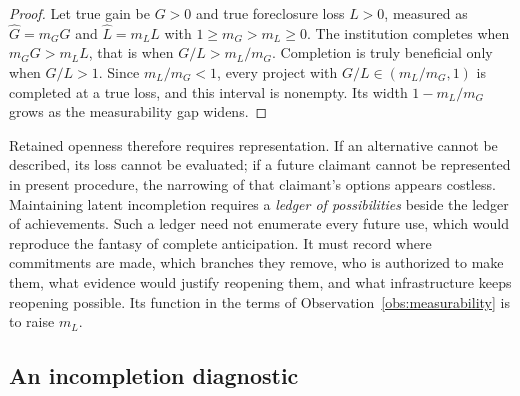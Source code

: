 \begin{proof}
Let true gain be $G>0$ and true foreclosure loss $L>0$, measured as $\widehat G=m_GG$ and $\widehat L=m_LL$ with $1\geq m_G>m_L\geq 0$. The institution completes when $m_GG>m_LL$, that is when $G/L>m_L/m_G$. Completion is truly beneficial only when $G/L>1$. Since $m_L/m_G<1$, every project with $G/L\in(m_L/m_G,1)$ is completed at a true loss, and this interval is nonempty. Its width $1-m_L/m_G$ grows as the measurability gap widens.
\end{proof}

Retained openness therefore requires representation. If an alternative cannot be described, its loss cannot be evaluated; if a future claimant cannot be represented in present procedure, the narrowing of that claimant's options appears costless. Maintaining latent incompletion requires a \emph{ledger of possibilities} beside the ledger of achievements. Such a ledger need not enumerate every future use, which would reproduce the fantasy of complete anticipation. It must record where commitments are made, which branches they remove, who is authorized to make them, what evidence would justify reopening them, and what infrastructure keeps reopening possible. Its function in the terms of Observation~\ref{obs:measurability} is to raise $m_L$.

\subsection{An incompletion diagnostic}

